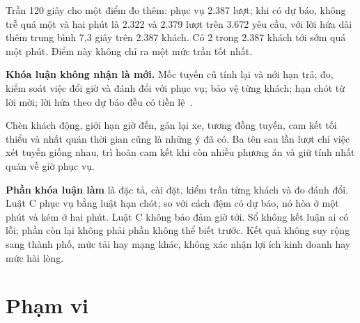 Trần 120 giây cho một điểm đo thêm: phục vụ 2.387 lượt; khi có dự báo, không trễ quá một và hai phút là
2.322 và 2.379 lượt trên 3.672 yêu cầu, với lời hứa dài thêm trung bình 7,3 giây trên 2.387 khách.
Có 2 trong 2.387 khách tới sớm quá một phút. Điểm này không chỉ ra một mức trần tốt nhất.

\begin{khungy}
\textbf{Khóa luận không nhận là mới.} Mốc tuyến cũ tính lại và nới hạn trả; đo, kiểm soát việc đổi giờ và
đánh đổi với phục vụ; bảo vệ từng khách; hạn chót từ lời mời; lời hứa theo dự báo đều có
tiền lệ~\cite{horl2022,fielbaum2020,elmi2026,schulz2026,hu2022}.

Chèn khách động, giới hạn giờ đến, gán lại xe, tương đồng tuyến, cam kết tối thiểu và nhất quán thời gian
cũng là những ý đã có. Ba tên sau lần lượt chỉ việc xét tuyến giống nhau, trì hoãn cam kết
khi còn nhiều phương án và giữ tính nhất quán về giờ phục vụ.

\textbf{Phần khóa luận làm} là đặc tả, cài đặt, kiểm trần từng khách và đo đánh đổi. Luật C phục vụ bằng
luật hạn chót; so với cách đệm có dự báo, nó hòa ở một phút và kém ở hai phút. Luật C không bảo đảm giờ tới.
Sổ không kết luận ai có lỗi; phần còn lại không phải phần không thể biết trước. Kết quả không suy rộng
sang thành phố, mức tải hay mạng khác, không xác nhận lợi ích kinh doanh hay mức hài lòng.
\end{khungy}

\section{Phạm vi}
\label{muc:c1-phamvi}

